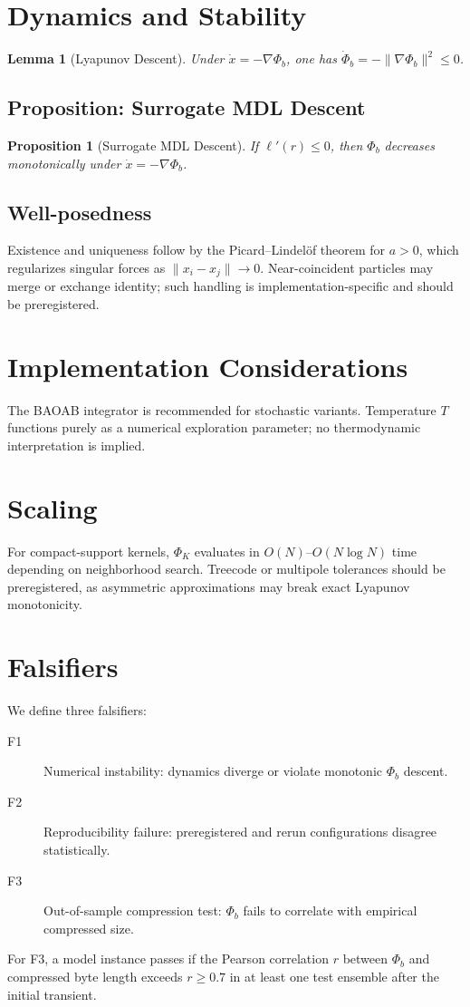 \documentclass[11pt]{article}
\newtheorem{lemma}{Lemma}
\newtheorem{proposition}{Proposition}
\begin{document}
\section{Dynamics and Stability}
\begin{lemma}[Lyapunov Descent]
Under $\dot{x} = -\nabla \Phi_b$, one has $\dot{\Phi}_b = -\|\nabla \Phi_b\|^2 \le 0$.
\end{lemma}

\subsection{Proposition: Surrogate MDL Descent}
\begin{proposition}[Surrogate MDL Descent]
If $\ell'(r)\le 0$, then $\Phi_b$ decreases monotonically under $\dot{x}=-\nabla\Phi_b$.
\end{proposition}

\subsection{Well-posedness}
Existence and uniqueness follow by the Picard–Lindelöf theorem for $a>0$, which regularizes singular forces as $\|x_i-x_j\|\to0$. 
Near-coincident particles may merge or exchange identity; such handling is implementation-specific and should be preregistered.

\section{Implementation Considerations}
The BAOAB integrator is recommended for stochastic variants. 
Temperature \(T\) functions purely as a numerical exploration parameter; no thermodynamic interpretation is implied.

\section{Scaling}
For compact-support kernels, $\Phi_K$ evaluates in \(O(N)\)–\(O(N\log N)\) time depending on neighborhood search. 
Treecode or multipole tolerances should be preregistered, as asymmetric approximations may break exact Lyapunov monotonicity.

\section{Falsifiers}
We define three falsifiers:
\begin{description}
\item[F1] Numerical instability: dynamics diverge or violate monotonic $\Phi_b$ descent.
\item[F2] Reproducibility failure: preregistered and rerun configurations disagree statistically.
\item[F3] Out-of-sample compression test: $\Phi_b$ fails to correlate with empirical compressed size.
\end{description}
For F3, a model instance passes if the Pearson correlation \(r\) between \(\Phi_b\) and compressed byte length exceeds \(r \ge 0.7\) in at least one test ensemble after the initial transient.
\end{document}
